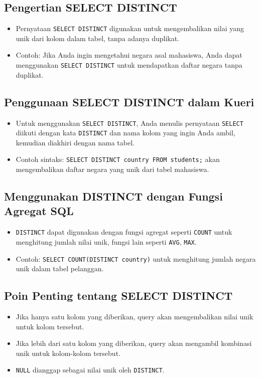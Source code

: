 \documentclass{article}
\begin{document}
\subsection{Pengertian SELECT DISTINCT}
\begin{itemize}
    \item Pernyataan \texttt{SELECT DISTINCT} digunakan untuk mengembalikan nilai yang unik dari kolom dalam tabel, tanpa adanya duplikat.
    \item Contoh: Jika Anda ingin mengetahui negara asal mahasiswa, Anda dapat menggunakan \texttt{SELECT DISTINCT} untuk mendapatkan daftar negara tanpa duplikat.
\end{itemize}

\subsection{Penggunaan SELECT DISTINCT dalam Kueri}
\begin{itemize}
    \item Untuk menggunakan \texttt{SELECT DISTINCT}, Anda menulis pernyataan \texttt{SELECT} diikuti dengan kata \texttt{DISTINCT} dan nama kolom yang ingin Anda ambil, kemudian diakhiri dengan nama tabel.
    \item Contoh sintaks: \texttt{SELECT DISTINCT country FROM students;} akan mengembalikan daftar negara yang unik dari tabel mahasiswa.
\end{itemize}

\subsection{Menggunakan DISTINCT dengan Fungsi Agregat SQL}
\begin{itemize}
    \item \texttt{DISTINCT} dapat digunakan dengan fungsi agregat seperti \texttt{COUNT} untuk menghitung jumlah nilai unik, fungsi lain seperti \texttt{AVG}, \texttt{MAX}.
    \item Contoh: \texttt{SELECT COUNT(DISTINCT country)} untuk menghitung jumlah negara unik dalam tabel pelanggan.
\end{itemize}

\subsection{Poin Penting tentang SELECT DISTINCT}
\begin{itemize}
    \item Jika hanya satu kolom yang diberikan, query akan mengembalikan nilai unik untuk kolom tersebut.
    \item Jika lebih dari satu kolom yang diberikan, query akan mengambil kombinasi unik untuk kolom-kolom tersebut.
    \item \texttt{NULL} dianggap sebagai nilai unik oleh \texttt{DISTINCT}.
\end{itemize}
\newpage
\end{document}
